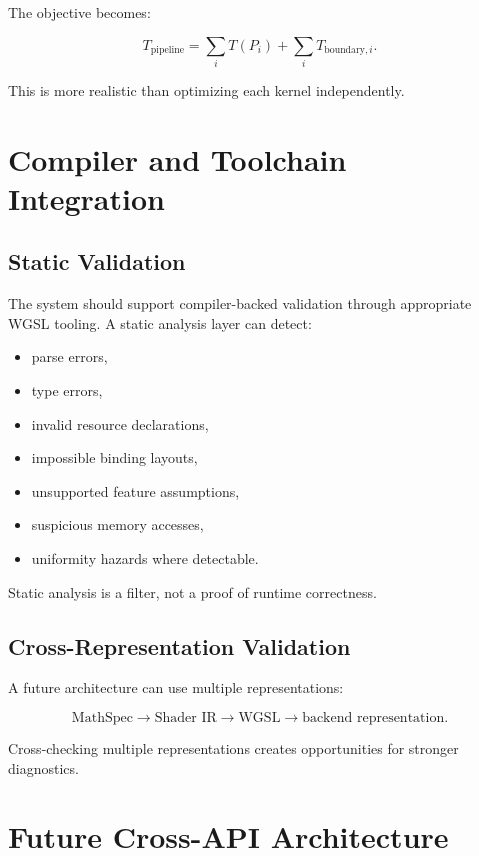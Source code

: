 \documentclass[11pt,a4paper,oneside]{report}
\begin{document}
The objective becomes:

\begin{equation}
T_{\mathrm{pipeline}}
=
\sum_i T(P_i)
+
\sum_i T_{\mathrm{boundary},i}.
\end{equation}

This is more realistic than optimizing each kernel independently.

\chapter{Compiler and Toolchain Integration}

\section{Static Validation}

The system should support compiler-backed validation through appropriate WGSL tooling. A static
analysis layer can detect:

\begin{itemize}
  \item parse errors,
  \item type errors,
  \item invalid resource declarations,
  \item impossible binding layouts,
  \item unsupported feature assumptions,
  \item suspicious memory accesses,
  \item uniformity hazards where detectable.
\end{itemize}

Static analysis is a filter, not a proof of runtime correctness.

\section{Cross-Representation Validation}

A future architecture can use multiple representations:

\[
\text{MathSpec}
\rightarrow
\text{Shader IR}
\rightarrow
\text{WGSL}
\rightarrow
\text{backend representation}.
\]

Cross-checking multiple representations creates opportunities for stronger diagnostics.

\chapter{Future Cross-API Architecture}
\end{document}
